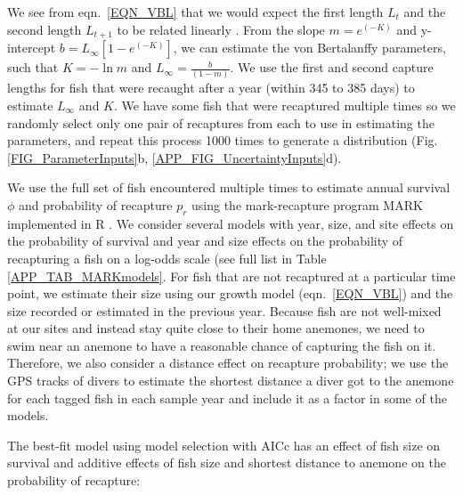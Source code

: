 \documentclass[12pt, oneside]{article}   	%
\begin{document}
We see from eqn.\ \ref{EQN_VBL} that we would expect the first length $L_t$ and the second length $L_{t+1}$ to be related linearly \citep{hart2009estimating}. From the slope $m = e^{(-K)}$ and y-intercept $b =  L_\infty[1 - e^{(-K)}]$, we can estimate the von Bertalanffy parameters, such that $K = -\ln m$ and $L_\infty = \frac{b}{(1-m)}$. We use the first and second capture lengths for fish that were recaught after a year (within 345 to 385 days) to estimate $L_\infty$ and $K$. We have some fish that were recaptured multiple times so we randomly select only one pair of recaptures from each to use in estimating the parameters, and repeat this process 1000 times to generate a distribution (Fig. \ref{FIG_ParameterInputs}b, \ref{APP_FIG_UncertaintyInputs}d).

We use the full set of fish encountered multiple times to estimate annual survival $\phi$ and probability of recapture $p_r$ using the mark-recapture program MARK implemented in R \citep{RMark_Laake2013}. We consider several models with year, size, and site effects on the probability of survival and year and size effects on the probability of recapturing a fish on a log-odds scale (see full list in Table \ref{APP_TAB_MARKmodels}. For fish that are not recaptured at a particular time point, we estimate their size using our growth model (eqn.\ \ref{EQN_VBL}) and the size recorded or estimated in the previous year. Because fish are not well-mixed at our sites and instead stay quite close to their home anemones, we need to swim near an anemone to have a reasonable chance of capturing the fish on it. Therefore, we also consider a distance effect on recapture probability; we use the GPS tracks of divers to estimate the shortest distance a diver got to the anemone for each tagged fish in each sample year and include it as a factor in some of the models.

The best-fit model using model selection with AICc has an effect of fish size on survival and additive effects of fish size and shortest distance to anemone on the probability of recapture:

\end{document}
